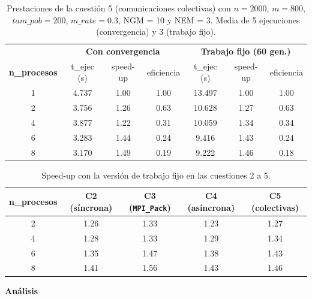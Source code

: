 \documentclass[12pt]{article}
\begin{document}
\begin{enumerate}
\begin{table}[htbp]
\centering
\begin{tabular}{c|ccc|ccc}
\toprule
& \multicolumn{3}{c|}{\textbf{Con convergencia}} & \multicolumn{3}{c}{\textbf{Trabajo fijo (60 gen.)}} \\
\textbf{n\_procesos} & t\_ejec (s) & speed-up & eficiencia & t\_ejec (s) & speed-up & eficiencia \\
\midrule
1 & 4.737 & 1.00 & 1.00 & 13.497 & 1.00 & 1.00 \\
2 & 3.756 & 1.26 & 0.63 & 10.628 & 1.27 & 0.63 \\
4 & 3.877 & 1.22 & 0.31 & 10.059 & 1.34 & 0.34 \\
6 & 3.283 & 1.44 & 0.24 & 9.416 & 1.43 & 0.24 \\
8 & 3.170 & 1.49 & 0.19 & 9.222 & 1.46 & 0.18 \\
\bottomrule
\end{tabular}
\caption{Prestaciones de la cuestión 5 (comunicaciones colectivas) con $n=2000$, $m=800$, $tam\_pob=200$, $m\_rate=0.3$, NGM = 10 y NEM = 3. Media de 5 ejecuciones (convergencia) y 3 (trabajo fijo).}
\label{tab:c5_prestaciones}
\end{table}

\begin{table}[htbp]
\centering
\begin{tabular}{c|cccc}
\toprule
\textbf{n\_procesos} & \textbf{C2 (síncrona)} & \textbf{C3 (\texttt{MPI\_Pack})} & \textbf{C4 (asíncrona)} & \textbf{C5 (colectivas)} \\
\midrule
2 & 1.26 & 1.33 & 1.23 & 1.27 \\
4 & 1.28 & 1.33 & 1.29 & 1.34 \\
6 & 1.35 & 1.47 & 1.38 & 1.43 \\
8 & 1.41 & 1.56 & 1.43 & 1.46 \\
\bottomrule
\end{tabular}
\caption{Speed-up con la versión de trabajo fijo en las cuestiones 2 a 5.}
\label{tab:c5_comparacion}
\end{table}

\vspace{0.5cm}

\medskip
\noindent\textbf{Análisis}\par
\smallskip


\end{enumerate}
\end{document}
